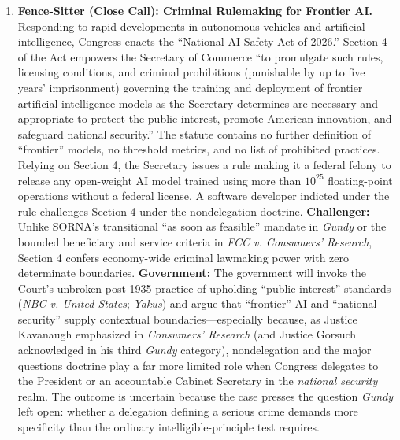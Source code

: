 \documentclass[12pt]{article}
\begin{document}
\begin{enumerate}
\item \textbf{Fence-Sitter (Close Call): Criminal Rulemaking for Frontier AI.} Responding to rapid developments in autonomous vehicles and artificial intelligence, Congress enacts the ``National AI Safety Act of 2026.'' Section 4 of the Act empowers the Secretary of Commerce ``to promulgate such rules, licensing conditions, and criminal prohibitions (punishable by up to five years' imprisonment) governing the training and deployment of frontier artificial intelligence models as the Secretary determines are necessary and appropriate to protect the public interest, promote American innovation, and safeguard national security.'' The statute contains no further definition of ``frontier'' models, no threshold metrics, and no list of prohibited practices. Relying on Section 4, the Secretary issues a rule making it a federal felony to release any open-weight AI model trained using more than $10^{25}$ floating-point operations without a federal license. A software developer indicted under the rule challenges Section 4 under the nondelegation doctrine. \textbf{Challenger:} Unlike SORNA's transitional ``as soon as feasible'' mandate in \textit{Gundy} or the bounded beneficiary and service criteria in \textit{FCC v. Consumers' Research}, Section 4 confers economy-wide criminal lawmaking power with zero determinate boundaries. \textbf{Government:} The government will invoke the Court's unbroken post-1935 practice of upholding ``public interest'' standards (\textit{NBC v. United States}; \textit{Yakus}) and argue that ``frontier'' AI and ``national security'' supply contextual boundaries---especially because, as Justice Kavanaugh emphasized in \textit{Consumers' Research} (and Justice Gorsuch acknowledged in his third \textit{Gundy} category), nondelegation and the major questions doctrine play a far more limited role when Congress delegates to the President or an accountable Cabinet Secretary in the \textit{national security} realm. The outcome is uncertain because the case presses the question \textit{Gundy} left open: whether a delegation defining a serious crime demands more specificity than the ordinary intelligible-principle test requires.

\end{enumerate}
\end{document}
